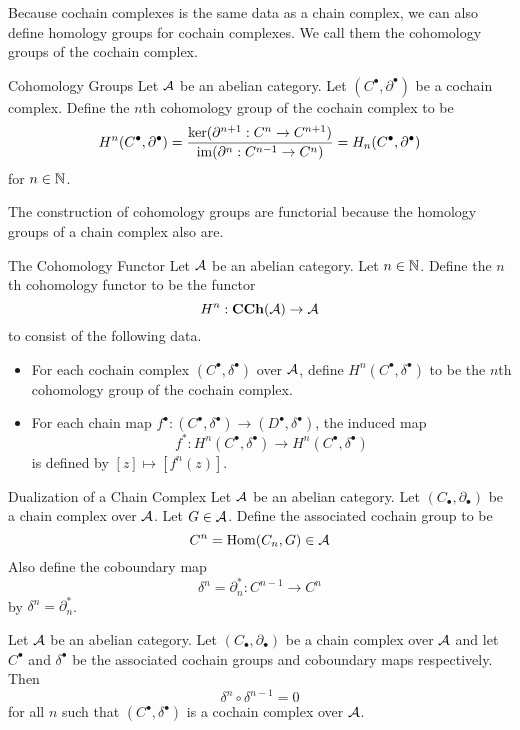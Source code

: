 \documentclass[a4paper]{article}
\begin{document}
Because cochain complexes is the same data as a chain complex, we can also define homology groups for cochain complexes. We call them the cohomology groups of the cochain complex. 

\begin{defn}{Cohomology Groups}{} Let $\mathcal{A}$ be an abelian category. Let $(C^\bullet,\partial^\bullet)$ be a cochain complex. Define the $n$th cohomology group of the cochain complex to be $$H^n(C^\bullet,\partial^\bullet)=\frac{\ker(\partial^{n+1}:C^n\to C^{n+1})}{\operatorname{im}(\partial^n:C^{n-1}\to C^n)}=H_n(C^\bullet,\partial^\bullet)$$ for $n\in\mathbb{N}$. 
\end{defn}

The construction of cohomology groups are functorial because the homology groups of a chain complex also are. 

\begin{defn}{The Cohomology Functor}{} Let $\mathcal{A}$ be an abelian category. Let $n\in\mathbb{N}$. Define the $n$th cohomology functor to be the functor $$H^n:\bold{CCh}(\mathcal{A})\to\mathcal{A}$$ to consist of the following data. 
\begin{itemize}
\item For each cochain complex $(C^\bullet,\delta^\bullet)$ over $\mathcal{A}$, define $H^n(C^\bullet,\delta^\bullet)$ to be the $n$th cohomology group of the cochain complex. 
\item For each chain map $f^\bullet:(C^\bullet,\delta^\bullet)\to(D^\bullet,\delta^\bullet)$, the induced map $$f^\ast:H^n(C^\bullet,\delta^\bullet)\to H^n(C^\bullet,\delta^\bullet)$$ is defined by $[z]\mapsto[f^n(z)]$. 
\end{itemize}
\end{defn}

\begin{defn}{Dualization of a Chain Complex}{} Let $\mathcal{A}$ be an abelian category. Let $(C_\bullet,\partial_\bullet)$ be a chain complex over $\mathcal{A}$. Let $G\in\mathcal{A}$. Define the associated cochain group to be $$C^n=\operatorname{Hom}(C_n,G)\in\mathcal{A}$$ Also define the coboundary map $$\delta^n=\partial_n^\ast:C^{n-1}\to C^n$$ by $\delta^n=\partial_n^\ast$. 
\end{defn}

\begin{lmm}{}{} Let $\mathcal{A}$ be an abelian category. Let $(C_\bullet,\partial_\bullet)$ be a chain complex over $\mathcal{A}$ and let $C^\bullet$ and $\delta^\bullet$ be the associated cochain groups and coboundary maps respectively. Then $$\delta^n\circ\delta^{n-1}=0$$ for all $n$ such that $(C^\bullet,\delta^\bullet)$ is a cochain complex over $\mathcal{A}$. 
\end{lmm}
\end{document}
